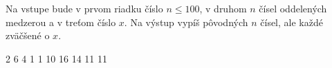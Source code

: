 




Na vstupe bude v prvom riadku číslo $n \leq 100$, v druhom $n$ čísel oddelených medzerou a v treťom číslo $x$.
Na výstup vypíš pôvodných $n$ čísel, ale každé zväčšené o $x$.

2 6 4 1 1
10
 16 14 11 11 
\koniec


